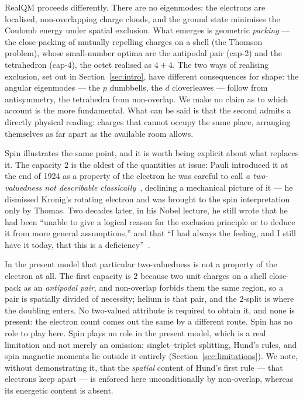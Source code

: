 \documentclass[11pt]{article}
\begin{document}
RealQM proceeds differently. There are no eigenmodes: the electrons are localised,
non-overlapping charge clouds, and the ground state minimises the Coulomb energy under
spatial exclusion. What emerges is geometric \emph{packing} --- the close-packing of
mutually repelling charges on a shell (the Thomson problem), whose small-number optima are
the antipodal pair (cap-2) and the tetrahedron (cap-4), the octet realised as $4{+}4$.
The two
ways of realising exclusion, set out in Section~\ref{sec:intro}, have different consequences
for shape: the angular eigenmodes --- the $p$ dumbbells, the $d$ cloverleaves --- follow from
antisymmetry, the tetrahedra from non-overlap. We make no claim as to which account is the
more fundamental. What can be said is that the second admits a directly physical reading:
charges that cannot occupy the same place, arranging themselves as far apart as the
available room allows.

Spin illustrates the same point, and it is worth being explicit about what replaces it. The
capacity $2$ is the oldest of the quantities at issue: Pauli introduced it at the end of 1924 as
a property of the electron he was careful to call \emph{a two-valuedness not describable
classically}~\cite{Pauli1925,Giulini2008}, declining a mechanical picture of it --- he dismissed
Kronig's rotating electron and was brought to the spin interpretation only by Thomas. Two
decades later, in his Nobel lecture, he still wrote that he had been ``unable to give a logical
reason for the exclusion principle or to deduce it from more general assumptions,'' and that ``I
had always the feeling, and I still have it today, that this is a
deficiency''~\cite{PauliNobel}.

In the present model that particular two-valuedness is not a property of the electron at all. The
first capacity is $2$ because two unit charges on a shell close-pack as an \emph{antipodal pair},
and non-overlap forbids them the same region, so a pair is spatially divided of necessity;
helium is that pair, and the $2$-split is where the doubling enters. No two-valued attribute is
required to obtain it, and none is present: the electron count comes out the same by a different
route. Spin has no role to play here. Spin plays no role in
the present model, which is a real limitation and not merely an omission: singlet--triplet
splitting, Hund's rules, and spin magnetic moments lie outside it entirely
(Section~\ref{sec:limitations}). We note, without demonstrating it, that the
\emph{spatial} content of Hund's first rule --- that electrons keep apart --- is enforced
here unconditionally by non-overlap, whereas its energetic content is absent.
\end{document}

